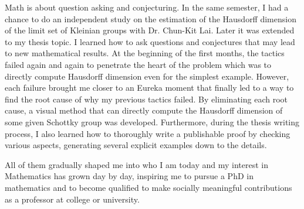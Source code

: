 \documentclass[11pt]{amsart}
\begin{document}
Math is about question asking and conjecturing. In the same semester, I had a chance to do an independent study on the estimation of the Hausdorff dimension of the limit set of Kleinian groups with Dr. Chun-Kit Lai. Later it was extended to my thesis topic. I learned how to ask questions and conjectures that may lead to new mathematical results. At the beginning of the first months, the tactics failed again and again to penetrate the heart of the problem which was to directly compute Hausdorff dimension even for the simplest example. However, each failure brought me closer to an Eureka moment that finally led to a way to find the root cause of why my previous tactics failed. By eliminating each root cause, a visual method that can directly compute the Hausdorff dimension of some given Schottky group was developed. Furthermore, during the thesis writing process, I also learned how to thoroughly write a publishable proof by checking various aspects, generating several explicit examples down to the details.


All of them gradually shaped me into who I am today and my interest in Mathematics has grown day by day, inspiring me to pursue a PhD in mathematics and to become qualified to make socially meaningful contributions as a professor at college or university.
\end{document}
